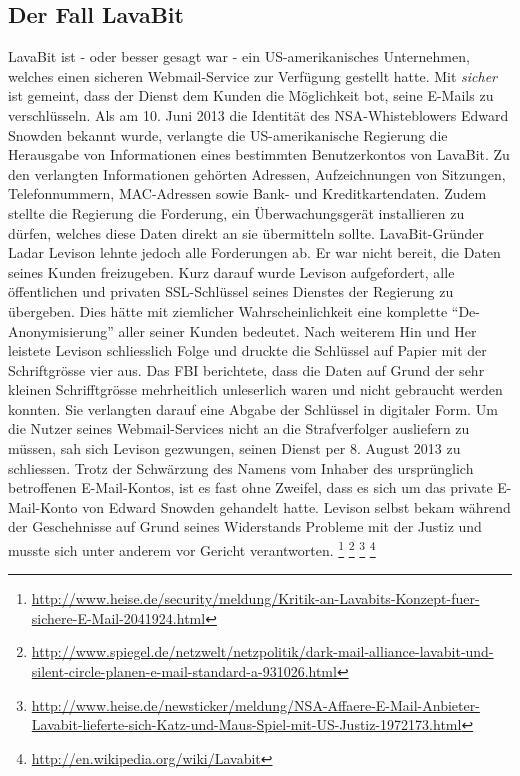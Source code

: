 \subsection{Der Fall LavaBit}
LavaBit ist - oder besser gesagt war - ein US-amerikanisches Unternehmen, welches einen sicheren Webmail-Service zur Verfügung gestellt hatte. Mit \textit{sicher} ist gemeint, dass der Dienst dem Kunden die Möglichkeit bot, seine E-Mails zu verschlüsseln. Als am 10. Juni 2013 die Identität des NSA-Whisteblowers Edward Snowden bekannt wurde, verlangte die US-amerikanische Regierung die Herausgabe von Informationen eines bestimmten Benutzerkontos von LavaBit. Zu den verlangten Informationen gehörten Adressen, Aufzeichnungen von Sitzungen, Telefonnummern, MAC-Adressen sowie Bank- und Kreditkartendaten. Zudem stellte die Regierung die Forderung, ein Überwachungsgerät installieren zu dürfen, welches diese Daten direkt an sie übermitteln sollte. LavaBit-Gründer Ladar Levison lehnte jedoch alle Forderungen ab. Er war nicht bereit, die Daten seines Kunden freizugeben. Kurz darauf wurde Levison aufgefordert, alle öffentlichen und privaten SSL-Schlüssel seines Dienstes der Regierung zu übergeben. Dies hätte mit ziemlicher Wahrscheinlichkeit eine komplette ``De-Anonymisierung'' aller seiner Kunden bedeutet. Nach weiterem Hin und Her leistete Levison schliesslich Folge und druckte die Schlüssel auf Papier mit der Schriftgrösse vier aus. Das FBI berichtete, dass die Daten auf Grund der sehr kleinen Schrifftgrösse mehrheitlich unleserlich waren und nicht gebraucht werden konnten. Sie verlangten darauf eine Abgabe der Schlüssel in digitaler Form. Um die Nutzer seines Webmail-Services nicht an die Strafverfolger ausliefern zu müssen, sah sich Levison gezwungen, seinen Dienst per 8. August 2013 zu schliessen. Trotz der Schwärzung des Namens vom Inhaber des ursprünglich betroffenen E-Mail-Kontos, ist es fast ohne Zweifel, dass es sich um das private E-Mail-Konto von Edward Snowden gehandelt hatte. Levison selbst bekam während der Geschehnisse auf Grund seines Widerstands Probleme mit der Justiz und musste sich unter anderem vor Gericht verantworten.
\footnote{\url{http://www.heise.de/security/meldung/Kritik-an-Lavabits-Konzept-fuer-sichere-E-Mail-2041924.html}}
\footnote{\url{http://www.spiegel.de/netzwelt/netzpolitik/dark-mail-alliance-lavabit-und-silent-circle-planen-e-mail-standard-a-931026.html}}
\footnote{\url{http://www.heise.de/newsticker/meldung/NSA-Affaere-E-Mail-Anbieter-Lavabit-lieferte-sich-Katz-und-Maus-Spiel-mit-US-Justiz-1972173.html}}
\footnote{\url{http://en.wikipedia.org/wiki/Lavabit}}

